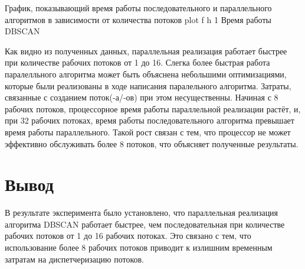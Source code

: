 \newpage
График, показывающий время работы последовательного и параллельного алгоритмов в зависимости от количества потоков\newline
{plot} %
{f} %
{h} %
{1\textwidth} %
{Время работы DBSCAN} %
\newpage

Как видно из полученных данных, параллельная реализация работает быстрее при количестве рабочих потоков от 1 до 16. 
Слегка более быстрая работа паралелльного алгоритма может быть объяснена небольшими оптимизациями, которые были реализованы в ходе написания паралельного алгоритма.
Затраты, связанные с созданием поток(-а/-ов) при этом несущественны.
Начиная с 8 рабочих потоков, процессорное время работы параллельной реализации растёт, и, при 32 рабочих потоках, время работы последовательного алгоритма превышает время работы параллельного.
Такой рост связан с тем, что процессор не может эффективно обслуживать более 8 потоков, что объясняет полученные результаты.

\section*{Вывод}
В результате эксперимента было установлено, что параллельная реализация алгоритма DBSCAN работает быстрее, чем последовательная при количестве рабочих потоков от 1 до 16 рабочих потоках. 
Это связано с тем, что использование более 8 рабочих потоков приводит к излишним временным затратам на диспетчеризацию потоков. 


